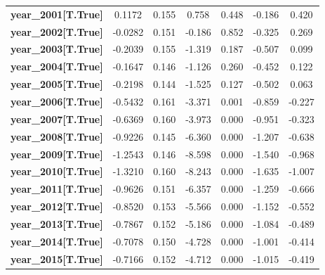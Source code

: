 \begin{center}
\begin{tabular}{lcccccc}
\textbf{year\_2001[T.True]} &       0.1172  &        0.155     &     0.758  &         0.448        &       -0.186    &        0.420     \\
\textbf{year\_2002[T.True]} &      -0.0282  &        0.151     &    -0.186  &         0.852        &       -0.325    &        0.269     \\
\textbf{year\_2003[T.True]} &      -0.2039  &        0.155     &    -1.319  &         0.187        &       -0.507    &        0.099     \\
\textbf{year\_2004[T.True]} &      -0.1647  &        0.146     &    -1.126  &         0.260        &       -0.452    &        0.122     \\
\textbf{year\_2005[T.True]} &      -0.2198  &        0.144     &    -1.525  &         0.127        &       -0.502    &        0.063     \\
\textbf{year\_2006[T.True]} &      -0.5432  &        0.161     &    -3.371  &         0.001        &       -0.859    &       -0.227     \\
\textbf{year\_2007[T.True]} &      -0.6369  &        0.160     &    -3.973  &         0.000        &       -0.951    &       -0.323     \\
\textbf{year\_2008[T.True]} &      -0.9226  &        0.145     &    -6.360  &         0.000        &       -1.207    &       -0.638     \\
\textbf{year\_2009[T.True]} &      -1.2543  &        0.146     &    -8.598  &         0.000        &       -1.540    &       -0.968     \\
\textbf{year\_2010[T.True]} &      -1.3210  &        0.160     &    -8.243  &         0.000        &       -1.635    &       -1.007     \\
\textbf{year\_2011[T.True]} &      -0.9626  &        0.151     &    -6.357  &         0.000        &       -1.259    &       -0.666     \\
\textbf{year\_2012[T.True]} &      -0.8520  &        0.153     &    -5.566  &         0.000        &       -1.152    &       -0.552     \\
\textbf{year\_2013[T.True]} &      -0.7867  &        0.152     &    -5.186  &         0.000        &       -1.084    &       -0.489     \\
\textbf{year\_2014[T.True]} &      -0.7078  &        0.150     &    -4.728  &         0.000        &       -1.001    &       -0.414     \\
\textbf{year\_2015[T.True]} &      -0.7166  &        0.152     &    -4.712  &         0.000        &       -1.015    &       -0.419     \\

\end{tabular}
\end{center}
